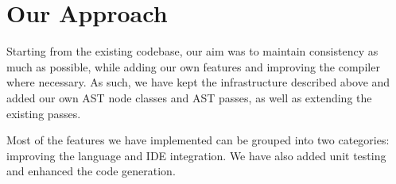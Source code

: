 \section{Our Approach}

Starting from the existing codebase, our aim was to maintain consistency as much as possible, while adding our own features and improving the compiler where necessary. As such, we have kept the infrastructure described above and added our own AST node classes and AST passes, as well as extending  the existing passes. 

Most of the features we have implemented can be grouped into two categories: improving the language and IDE integration. We have also added unit testing and enhanced the code generation.
